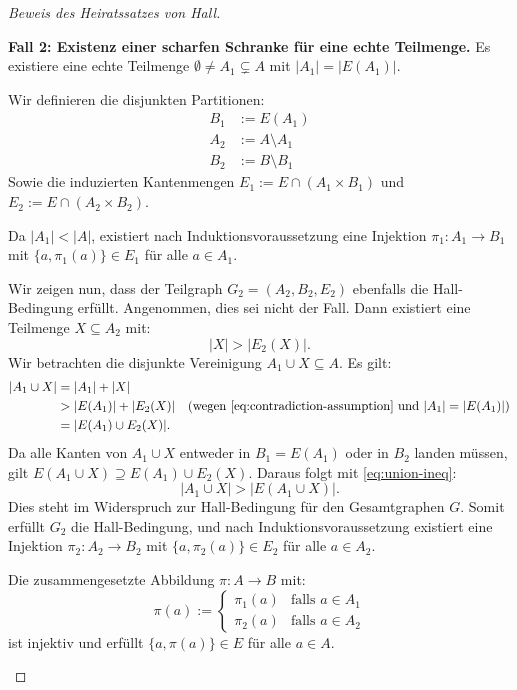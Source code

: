 \begin{proof}[Beweis des Heiratssatzes von Hall]
\begin{math-stroke}
\begin{short-proof}
\textbf{Fall 2: Existenz einer scharfen Schranke für eine echte Teilmenge.}
Es existiere eine echte Teilmenge $\emptyset \neq A_1 \subsetneq A$ mit $|A_1| = |E(A_1)|$.
\par\vspace{1ex}\noindent
Wir definieren die disjunkten Partitionen:
\begin{align*}
B_1 &:= E(A_1) \\
A_2 &:= A \setminus A_1 \\
B_2 &:= B \setminus B_1
\end{align*}
Sowie die induzierten Kantenmengen $E_1 := E \cap (A_1 \times B_1)$ und $E_2 := E \cap (A_2 \times B_2)$.
\par\vspace{1ex}\noindent
Da $|A_1| < |A|$, existiert nach Induktionsvoraussetzung eine Injektion $\pi_1 \colon A_1 \to B_1$ mit $\{a, \pi_1(a)\} \in E_1$ für alle $a \in A_1$.
\par\vspace{1ex}\noindent
Wir zeigen nun, dass der Teilgraph $G_2 = (A_2, B_2, E_2)$ ebenfalls die Hall-Bedingung erfüllt. Angenommen, dies sei nicht der Fall. Dann existiert eine Teilmenge $X \subseteq A_2$ mit:
\begin{equation}\label{eq:contradiction-assumption}
|X| > |E_2(X)|.
\end{equation}
Wir betrachten die disjunkte Vereinigung $A_1 \cup X \subseteq A$. Es gilt:
\begin{align}
|A_1 \cup X| &= |A_1| + |X| \nonumber \\
&> |E(A_1)| + |E_2(X)| \quad \text{(wegen \eqref{eq:contradiction-assumption} und } |A_1| = |E(A_1)|) \nonumber \\
&= |E(A_1) \cup E_2(X)|. \label{eq:union-ineq}
\end{align}
Da alle Kanten von $A_1 \cup X$ entweder in $B_1 = E(A_1)$ oder in $B_2$ landen müssen, gilt $E(A_1 \cup X) \supseteq E(A_1) \cup E_2(X)$. Daraus folgt mit \eqref{eq:union-ineq}:
\[
|A_1 \cup X| > |E(A_1 \cup X)|.
\]
Dies steht im Widerspruch zur Hall-Bedingung für den Gesamtgraphen $G$. Somit erfüllt $G_2$ die Hall-Bedingung, und nach Induktionsvoraussetzung existiert eine Injektion $\pi_2 \colon A_2 \to B_2$ mit $\{a, \pi_2(a)\} \in E_2$ für alle $a \in A_2$.
\par\vspace{1ex}\noindent
Die zusammengesetzte Abbildung $\pi \colon A \to B$ mit:
\[
\pi(a) := \begin{cases}
\pi_1(a) & \text{falls } a \in A_1 \\
\pi_2(a) & \text{falls } a \in A_2
\end{cases}
\]
ist injektiv und erfüllt $\{a, \pi(a)\} \in E$ für alle $a \in A$.
\end{short-proof}
\end{math-stroke}
\end{proof}

